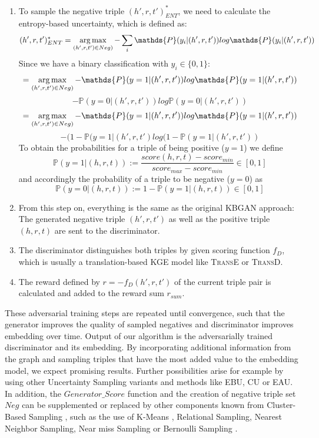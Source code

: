 \begin{enumerate}
    \item 
    To sample the negative triple $(h',r,t')^{*}_{ENT}$, we need to calculate the entropy-based uncertainty, which is defined as:
    $$(h',r,t')^{*}_{ENT} = \argmax_{(h',r,t') \in Neg)} - \sum_{i}{\mathds{P}(y_i | (h',r,t')) log \mathds{P}(y_i|(h',r,t'))}$$
    Since we have a binary classification with $y_i \in \{0,1\}$:\\
    $$= \argmax_{(h',r,t') \in Neg)} - \mathds{P}(y = 1| (h',r,t')) log \mathds{P}(y = 1|(h',r,t'))$$
    $$- \mathds{P}(y = 0| (h',r,t')) log \mathds{P}(y = 0|(h',r,t'))$$
    $$= \argmax_{(h',r,t') \in Neg)} - \mathds{P}(y = 1| (h',r,t')) log \mathds{P}(y = 1|(h',r,t'))$$
    $$- (1 - \mathds{P}(y = 1|(h',r,t') log(1 - \mathds{P}(y = 1|(h',r,t'))$$
    To obtain the probabilities for a triple of being positive ($y=1$) we define
    \begin{equation}
        \mathds{P}(y = 1|(h, r, t)) := \frac{score(h, r, t) - score_{min}}{score_{max} - score_{min}} \in [0, 1]
    \end{equation}
    and accordingly the probability of a triple to be negative ($y=0$) as
    \begin{equation}
        \mathds{P}(y = 0|(h, r, t)) := 1 - \mathds{P}(y = 1|(h, r, t)) \in [0,1]
    \end{equation}
    
    \item 
    From this step on, everything is the same as the original \ac{KBGAN} approach:
    The generated negative triple $(h',r,t')$ as well as the positive triple $(h, r, t)$ are sent to the discriminator.
    
    \item 
    The discriminator distinguishes both triples by given scoring function $f_D$, which is usually a translation-based \ac{KGE} model like \textsc{TransE} or \textsc{TransD}.
    
    \item 
    The reward defined by $r = - f_D(h',r,t')$ of the current triple pair is calculated and added to the reward sum $r_{sum}$.
    
\end{enumerate}
These adversarial training steps are repeated until convergence, such that the generator improves the quality of sampled negatives and discriminator improves embedding over time.
Output of our algorithm is the adversarially trained discriminator and its embedding.
By incorporating additional information from the graph and sampling triples that have the most added value to the embedding model, we expect promising results.
Further possibilities arise for example by using other Uncertainty Sampling variants and methods like \ac{EBU}, \ac{CU} or \ac{EAU}.
In addition, the $Generator\_Score$ function and the creation of negative triple set $Neg$ can be supplemented or replaced by other components known from Cluster-Based Sampling , such as the use of K-Means \cite{qianunderstanding}, Relational Sampling, Nearest Neighbor Sampling, Near miss Sampling \cite{kotnis2017analysis} or Bernoulli Sampling \cite{qianunderstanding}.

